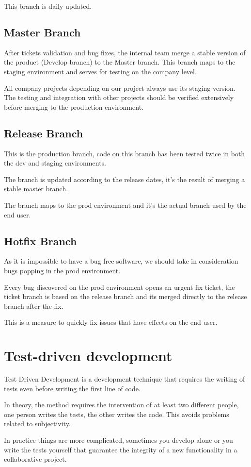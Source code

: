 \begin{spacing}{1.2}
This branch is daily updated.
\subsection{Master Branch}
After tickets validation and bug fixes, the internal team merge a stable version of the product (Develop branch) to the Master branch. This branch maps to the staging environment and serves for testing on the company level.

All company projects depending on our project always use its staging version. The testing and integration with other projects should be verified extensively before merging to the production environment.


\subsection{Release Branch}
This is the production branch, code on this branch has been tested twice in both the dev and staging environments.

The branch is updated according to the release dates, it's the result of merging a stable master branch.

The branch maps to the prod environment and it's the actual branch used by the end user.
\subsection{Hotfix Branch}
As it is impossible to have a bug free software, we should take in consideration bugs popping in the prod environment.

Every bug discovered on the prod environment opens an urgent fix ticket, the ticket branch is based on the release branch and its merged directly to the release branch after the fix.

This is a measure to quickly fix issues that have effects on the end user.
\section{Test-driven development}
Test Driven Development is a development technique that requires the writing of tests even before writing the first line of code.

In theory, the method requires the intervention of at least two different people, one person writes the tests, the other writes the code. This avoids problems related to subjectivity.

In practice things are more complicated, sometimes you develop alone or you write the tests yourself that guarantee the integrity of a new functionality in a collaborative project.


\end{spacing}
